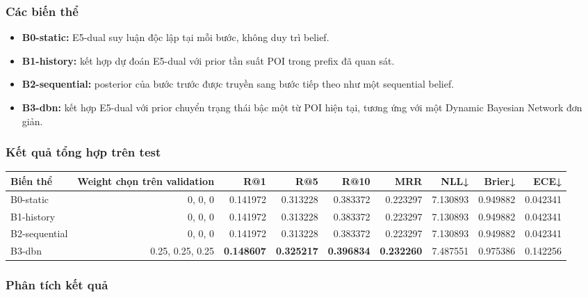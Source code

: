 \subsubsection*{Các biến thể}

\begin{itemize}
\item \textbf{B0-static:} E5-dual suy luận độc lập tại mỗi bước, không duy trì belief.
\item \textbf{B1-history:} kết hợp dự đoán E5-dual với prior tần suất POI trong prefix
đã quan sát.

\item \textbf{B2-sequential:} posterior của bước trước được truyền sang bước tiếp theo
như một sequential belief.

\item \textbf{B3-dbn:} kết hợp E5-dual với prior chuyển trạng thái bậc một từ POI hiện
tại, tương ứng với một Dynamic Bayesian Network đơn giản.

\end{itemize}

\subsubsection*{Kết quả tổng hợp trên test}

\begin{table}[!htbp]
\centering
\scriptsize
\setlength{\tabcolsep}{2.5pt}
\begin{adjustbox}{max width=\textwidth}
\begin{tabular}{@{}lrrrrrrrr@{}}
\toprule
Biến thể & Weight chọn trên validation & R@1 & R@5 & R@10 & MRR & NLL↓ & Brier↓ & ECE↓ \\
\midrule
B0-static & 0, 0, 0 & 0.141972 & 0.313228 & 0.383372 & 0.223297 & 7.130893 & 0.949882 & 0.042341 \\
B1-history & 0, 0, 0 & 0.141972 & 0.313228 & 0.383372 & 0.223297 & 7.130893 & 0.949882 & 0.042341 \\
B2-sequential & 0, 0, 0 & 0.141972 & 0.313228 & 0.383372 & 0.223297 & 7.130893 & 0.949882 & 0.042341 \\
B3-dbn & 0.25, 0.25, 0.25 & \textbf{0.148607} & \textbf{0.325217} & \textbf{0.396834} & \textbf{0.232260} & 7.487551 & 0.975386 & 0.142256 \\
\bottomrule
\end{tabular}
\end{adjustbox}
\end{table}

\subsubsection*{Phân tích kết quả}

